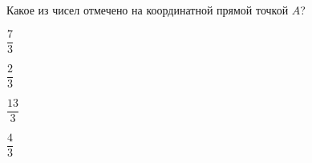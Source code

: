 \begin{exex}
	Какое из чисел отмечено на координатной прямой точкой $A$?
	\selectanswer
	\begin{enumcols}[columns=4]
		\item $\dfrac{7}{3}$
		\item $\dfrac{2}{3}$
		\item $\dfrac{13}{3}$
		\item $\dfrac{4}{3}$
	\end{enumcols}
\end{exex}
